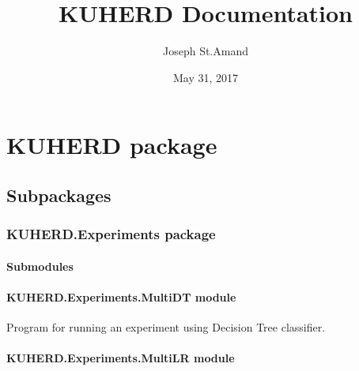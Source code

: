 \documentclass[letterpaper,10pt,english]{sphinxmanual}
\title{KUHERD Documentation}
\date{May 31, 2017}
\author{Joseph St.Amand}
\begin{document}
\maketitle
\sphinxtableofcontents
{}\label{\detokenize{index::doc}}



\chapter{KUHERD package}
\label{\detokenize{KUHERD:kuherd-package}}\label{\detokenize{KUHERD:welcome-to-kuherd-s-documentation}}\label{\detokenize{KUHERD::doc}}

\section{Subpackages}
\label{\detokenize{KUHERD:subpackages}}

\subsection{KUHERD.Experiments package}
\label{\detokenize{KUHERD.Experiments:kuherd-experiments-package}}\label{\detokenize{KUHERD.Experiments::doc}}

\subsubsection{Submodules}
\label{\detokenize{KUHERD.Experiments:submodules}}

\subsubsection{KUHERD.Experiments.MultiDT module}
\label{\detokenize{KUHERD.Experiments:module-KUHERD.Experiments.MultiDT}}\label{\detokenize{KUHERD.Experiments:kuherd-experiments-multidt-module}}

\begin{fulllineitems}
\label{\detokenize{KUHERD.Experiments:KUHERD.Experiments.MultiDT.MultiDT}}
Program for running an experiment using Decision Tree classifier.

\end{fulllineitems}



\subsubsection{KUHERD.Experiments.MultiLR module}
\label{\detokenize{KUHERD.Experiments:module-KUHERD.Experiments.MultiLR}}\label{\detokenize{KUHERD.Experiments:kuherd-experiments-multilr-module}}
\end{document}
